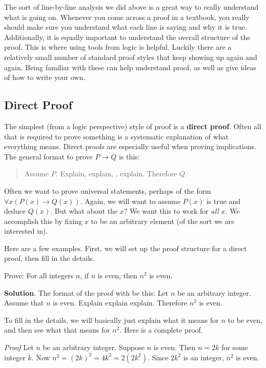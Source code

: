 \documentclass[11pt,]{book}
\makeatletter
\newcommand{\terminology}[1]{\textbf{#1}}
\theoremstyle{ptxplainnotitle}
\theoremstyle{ptxplaintitle}
\renewcommand*{\proofname}{Proof}
\renewenvironment{proof}[1][\proofname]{\par
  \pushQED{\qed}%
  \normalfont \topsep6\p@\@plus6\p@\relax
  \trivlist
  \item\relax
    {\itshape
    #1\@addpunct{.}}\hspace\labelsep\ignorespaces
}{%
  \popQED\endtrivlist\@endpefalse
}
\theoremstyle{ptxdefinitionnotitle}
\theoremstyle{ptxdefinitiontitle}
\theoremstyle{ptxdefinitionnotitle}
\theoremstyle{ptxdefinitiontitle}
\theoremstyle{ptxdefinitionnotitle}
\theoremstyle{ptxdefinitiontitle}
\theoremstyle{ptxdefinitiontitlenonumber}
\theoremstyle{ptxdefinitiontitlenonumber}
\numberwithin{equation}{chapter}
\newcommand{\imp}{\rightarrow}
\makeatother
\begin{document}
\par
\hypertarget{p-2387}{}%
The sort of line-by-line analysis we did above is a great way to really understand what is going on. Whenever you come across a proof in a textbook, you really should make sure you understand what each line is saying and why it is true. Additionally, it is equally important to understand the overall structure of the proof. This is where using tools from logic is helpful. Luckily there are a relatively small number of standard proof styles that keep showing up again and again. Being familiar with these can help understand proof, as well as give ideas of how to write your own.%
\typeout{************************************************}
\typeout{************************************************}
\subsection[{Direct Proof}]{Direct Proof}\label{subsection-22}
\hypertarget{p-2388}{}%
%
\par
\hypertarget{p-2389}{}%
The simplest (from a logic perspective) style of proof is a \terminology{direct proof}. Often all that is required to prove something is a systematic explanation of what everything means. Direct proofs are especially useful when proving implications. The general format to prove \(P \imp Q\) is this:%
\begin{quote}\hypertarget{blockquote-10}{}
\hypertarget{p-2390}{}%
Assume \(P\). Explain, explain, \textellipsis{}, explain. Therefore \(Q\).%
\end{quote}
\hypertarget{p-2391}{}%
Often we want to prove universal statements, perhaps of the form \(\forall x (P(x) \imp Q(x))\). Again, we will want to assume \(P(x)\) is true and deduce \(Q(x)\). But what about the \(x\)? We want this to work for \emph{all} \(x\). We accomplish this by fixing \(x\) to be an arbitrary element (of the sort we are interested in).%
\par
\hypertarget{p-2392}{}%
Here are a few examples. First, we will set up the proof structure for a direct proof, then fill in the details.%
\begin{example}\label{example-63}
\hypertarget{p-2393}{}%
Prove: For all integers \(n\), if \(n\) is even, then \(n^2\) is even.%
\par\smallskip%
\noindent\textbf{Solution}.\hypertarget{solution-246}{}\quad%
\hypertarget{p-2394}{}%
The format of the proof with be this: Let \(n\) be an arbitrary integer. Assume that \(n\) is even. Explain explain explain. Therefore \(n^2\) is even.%
\par
\hypertarget{p-2395}{}%
To fill in the details, we will basically just explain what it means for \(n\) to be even, and then see what that means for \(n^2\). Here is a complete proof.%
\begin{proof}\hypertarget{proof-22}{}
\hypertarget{p-2396}{}%
Let \(n\) be an arbitrary integer. Suppose \(n\) is even. Then \(n = 2k\) for some integer \(k\). Now \(n^2 = (2k)^2 = 4k^2 = 2(2k^2)\). Since \(2k^2\) is an integer, \(n^2\) is even.%
\end{proof}
\end{example}
\end{document}
